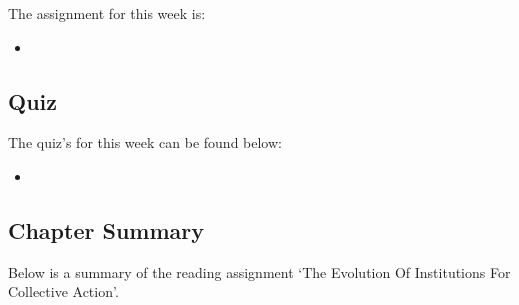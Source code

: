 The assignment for this week is:

\begin{itemize}
    \item {}
\end{itemize}

\subsection{Quiz}

The quiz's for this week can be found below:

\begin{itemize}
    \item {}
\end{itemize}

\newpage

\subsection{Chapter Summary}

Below is a summary of the reading assignment `The Evolution Of Institutions For Collective Action'.


